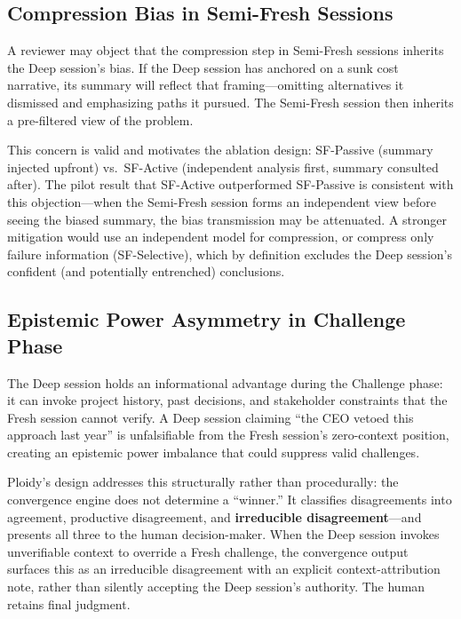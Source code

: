 \documentclass[11pt]{article}
\begin{document}
\subsection{Compression Bias in Semi-Fresh Sessions}
\label{sec:compression-bias}

A reviewer may object that the compression step in Semi-Fresh sessions inherits the Deep session's bias. If the Deep session has anchored on a sunk cost narrative, its summary will reflect that framing---omitting alternatives it dismissed and emphasizing paths it pursued. The Semi-Fresh session then inherits a pre-filtered view of the problem.

This concern is valid and motivates the ablation design: SF-Passive (summary injected upfront) vs.\ SF-Active (independent analysis first, summary consulted after). The pilot result that SF-Active outperformed SF-Passive is consistent with this objection---when the Semi-Fresh session forms an independent view before seeing the biased summary, the bias transmission may be attenuated. A stronger mitigation would use an independent model for compression, or compress only failure information (SF-Selective), which by definition excludes the Deep session's confident (and potentially entrenched) conclusions.

\subsection{Epistemic Power Asymmetry in Challenge Phase}
\label{sec:epistemic-power}

The Deep session holds an informational advantage during the Challenge phase: it can invoke project history, past decisions, and stakeholder constraints that the Fresh session cannot verify. A Deep session claiming ``the CEO vetoed this approach last year'' is unfalsifiable from the Fresh session's zero-context position, creating an epistemic power imbalance that could suppress valid challenges.

Ploidy's design addresses this structurally rather than procedurally: the convergence engine does not determine a ``winner.'' It classifies disagreements into agreement, productive disagreement, and \textbf{irreducible disagreement}---and presents all three to the human decision-maker. When the Deep session invokes unverifiable context to override a Fresh challenge, the convergence output surfaces this as an irreducible disagreement with an explicit context-attribution note, rather than silently accepting the Deep session's authority. The human retains final judgment.
\end{document}
